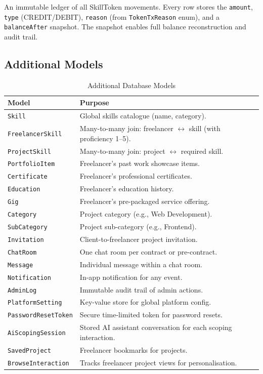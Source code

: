 An immutable ledger of all SkillToken movements. Every row stores the \texttt{amount}, \texttt{type} (CREDIT/DEBIT), \texttt{reason} (from \texttt{TokenTxReason} enum), and a \texttt{balanceAfter} snapshot. The snapshot enables full balance reconstruction and audit trail.

\subsection{Additional Models}

\begin{table}[H]
\centering
\caption{Additional Database Models}
\begin{tabularx}{\textwidth}{lX}
\toprule
\textbf{Model} & \textbf{Purpose} \\
\midrule
\texttt{Skill}            & Global skills catalogue (name, category). \\
\texttt{FreelancerSkill}  & Many-to-many join: freelancer $\leftrightarrow$ skill (with proficiency 1–5). \\
\texttt{ProjectSkill}     & Many-to-many join: project $\leftrightarrow$ required skill. \\
\texttt{PortfolioItem}    & Freelancer's past work showcase items. \\
\texttt{Certificate}      & Freelancer's professional certificates. \\
\texttt{Education}        & Freelancer's education history. \\
\texttt{Gig}              & Freelancer's pre-packaged service offering. \\
\texttt{Category}         & Project category (e.g., Web Development). \\
\texttt{SubCategory}      & Project sub-category (e.g., Frontend). \\
\texttt{Invitation}       & Client-to-freelancer project invitation. \\
\texttt{ChatRoom}         & One chat room per contract or pre-contract. \\
\texttt{Message}          & Individual message within a chat room. \\
\texttt{Notification}     & In-app notification for any event. \\
\texttt{AdminLog}         & Immutable audit trail of admin actions. \\
\texttt{PlatformSetting}  & Key-value store for global platform config. \\
\texttt{PasswordResetToken} & Secure time-limited token for password resets. \\
\texttt{AiScopingSession} & Stored AI assistant conversation for each scoping interaction. \\
\texttt{SavedProject}     & Freelancer bookmarks for projects. \\
\texttt{BrowseInteraction} & Tracks freelancer project views for personalisation. \\
\bottomrule
\end{tabularx}
\end{table}

